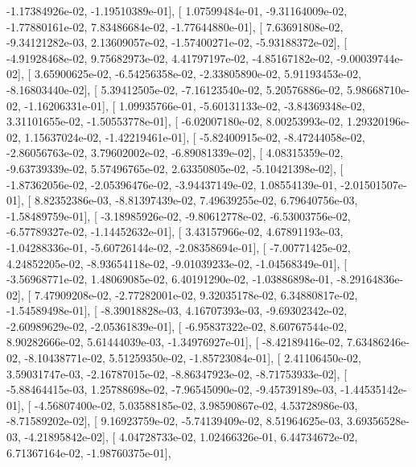\documentclass{article}
\begin{document}
         -1.17384926e-02,  -1.19510389e-01],
       [  1.07599484e-01,  -9.31164009e-02,  -1.77880161e-02,
          7.83486684e-02,  -1.77644880e-01],
       [  7.63691808e-02,  -9.34121282e-03,   2.13609057e-02,
         -1.57400271e-02,  -5.93188372e-02],
       [ -4.91928468e-02,   9.75682973e-02,   4.41797197e-02,
         -4.85167182e-02,  -9.00039744e-02],
       [  3.65900625e-02,  -6.54256358e-02,  -2.33805890e-02,
          5.91193453e-02,  -8.16803440e-02],
       [  5.39412505e-02,  -7.16123540e-02,   5.20576886e-02,
          5.98668710e-02,  -1.16206331e-01],
       [  1.09935766e-01,  -5.60131133e-02,  -3.84369348e-02,
          3.31101655e-02,  -1.50553778e-01],
       [ -6.02007180e-02,   8.00253993e-02,   1.29320196e-02,
          1.15637024e-02,  -1.42219461e-01],
       [ -5.82400915e-02,  -8.47244058e-02,  -2.86056763e-02,
          3.79602002e-02,  -6.89081339e-02],
       [  4.08315359e-02,  -9.63739339e-02,   5.57496765e-02,
          2.63350805e-02,  -5.10421398e-02],
       [ -1.87362056e-02,  -2.05396476e-02,  -3.94437149e-02,
          1.08554139e-01,  -2.01501507e-01],
       [  8.82352386e-03,  -8.81397439e-02,   7.49639255e-02,
          6.79640756e-03,  -1.58489759e-01],
       [ -3.18985926e-02,  -9.80612778e-02,  -6.53003756e-02,
         -6.57789327e-02,  -1.14452632e-01],
       [  3.43157966e-02,   4.67891193e-03,  -1.04288336e-01,
         -5.60726144e-02,  -2.08358694e-01],
       [ -7.00771425e-02,   4.24852205e-02,  -8.93654118e-02,
         -9.01039233e-02,  -1.04568349e-01],
       [ -3.56968771e-02,   1.48069085e-02,   6.40191290e-02,
         -1.03886898e-01,  -8.29164836e-02],
       [  7.47909208e-02,  -2.77282001e-02,   9.32035178e-02,
          6.34880817e-02,  -1.54589498e-01],
       [ -8.39018828e-03,   4.16707393e-03,  -9.69302342e-02,
         -2.60989629e-02,  -2.05361839e-01],
       [ -6.95837322e-02,   8.60767544e-02,   8.90282666e-02,
          5.61444039e-03,  -1.34976927e-01],
       [ -8.42189416e-02,   7.63486246e-02,  -8.10438771e-02,
          5.51259350e-02,  -1.85723084e-01],
       [  2.41106450e-02,   3.59031747e-03,  -2.16787015e-02,
         -8.86347923e-02,  -8.71753933e-02],
       [ -5.88464415e-03,   1.25788698e-02,  -7.96545090e-02,
         -9.45739189e-03,  -1.44535142e-01],
       [ -4.56807400e-02,   5.03588185e-02,   3.98590867e-02,
          4.53728986e-03,  -8.71589202e-02],
       [  9.16923759e-02,  -5.74139409e-02,   8.51964625e-03,
          3.69356528e-03,  -4.21895842e-02],
       [  4.04728733e-02,   1.02466326e-01,   6.44734672e-02,
          6.71367164e-02,  -1.98760375e-01],
\end{document}
